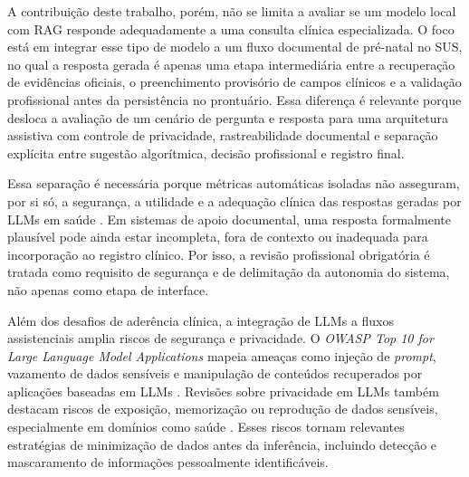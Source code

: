 A contribuição deste trabalho, porém, não se limita a avaliar se um modelo local com RAG responde adequadamente a uma consulta clínica especializada. O foco está em integrar esse tipo de modelo a um fluxo documental de pré-natal no SUS, no qual a resposta gerada é apenas uma etapa intermediária entre a recuperação de evidências oficiais, o preenchimento provisório de campos clínicos e a validação profissional antes da persistência no prontuário. Essa diferença é relevante porque desloca a avaliação de um cenário de pergunta e resposta para uma arquitetura assistiva com controle de privacidade, rastreabilidade documental e separação explícita entre sugestão algorítmica, decisão profissional e registro final.

Essa separação é necessária porque métricas automáticas isoladas não asseguram, por si só, a segurança, a utilidade e a adequação clínica das respostas geradas por LLMs em saúde \cite{tam2024framework}. Em sistemas de apoio documental, uma resposta formalmente plausível pode ainda estar incompleta, fora de contexto ou inadequada para incorporação ao registro clínico. Por isso, a revisão profissional obrigatória é tratada como requisito de segurança e de delimitação da autonomia do sistema, não apenas como etapa de interface.

Além dos desafios de aderência clínica, a integração de LLMs a fluxos assistenciais amplia riscos de segurança e privacidade. O \textit{OWASP Top 10 for Large Language Model Applications} mapeia ameaças como injeção de \textit{prompt}, vazamento de dados sensíveis e manipulação de conteúdos recuperados por aplicações baseadas em LLMs \cite{OWASPLLM2025}. Revisões sobre privacidade em LLMs também destacam riscos de exposição, memorização ou reprodução de dados sensíveis, especialmente em domínios como saúde \cite{yao2024survey, chen2025survey}. Esses riscos tornam relevantes estratégias de minimização de dados antes da inferência, incluindo detecção e mascaramento de informações pessoalmente identificáveis.

